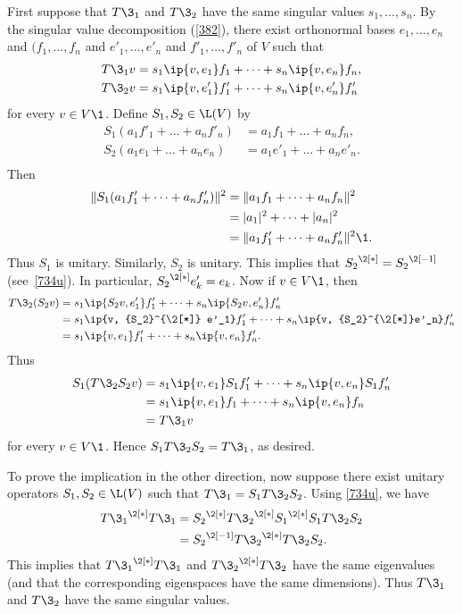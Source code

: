 \begin{Solution}
First suppose that $T\3_1$ and $T\3_2$ have the same singular values $s_1, \dots, s_n$.
By the singular value decomposition (\ref{382}), there exist orthonormal bases
$e_1, \dots, e_n$ and  $(f_1, \dots, f_n$ and $e'_1, \dots, e'_n$ and  $f'_1, \dots, f'_n$ of
$V$ such that
\begin{align*}
T\3_1v &= s_1 \ip{v, e_1} f_1 + \dots + s_n \ip{v, e_n} f_n, \\
T\3_2v &= s_1 \ip{v, e'_1} f'_1 + \dots + s_n \ip{v, e'_n} f'_n
\end{align*}
for every $v \in V\1$.  Define $S_1, S_2 \in \L(V)$ by
\begin{align*}
S_1(a_1 f'_1 + \dots + a_n f'_n) &= a_1 f_1 + \dots + a_n f_n, \\
S_2(a_1 e_1 + \dots + a_n e_n) &= a_1 e'_1 + \dots + a_n e'_n. \\
\end{align*}
Then
\begin{align*}
\|S_1(a_1 f'_1 + \dots + a_n f'_n)\|^2 &= \|a_1 f_1 + \dots + a_n f_n\|^2 \\
&= |a_1|^2 + \dots + |a_n|^2 \\
&= \|a_1 f'_1 + \dots + a_n f'_n\|^2\1.
\end{align*}
Thus $S_1$ is unitary.  Similarly, $S_2$ is unitary. This implies that
${S_2}^{\2[*]} = {S_2}^{\2[-1]}$ (see~\ref{734u}).  In particular, ${S_2}^{\2[*]} e'_k = e_k$.  Now
if $v \in V\1$, then
\begin{align*}
T\3_2(S_2 v) &= s_1 \ip{S_2v, e'_1} f'_1 + \dots + s_n \ip{S_2v, e'_n} f'_n \\
&= s_1 \ip{v, {S_2}^{\2[*]} e'_1} f'_1 + \dots + s_n \ip{v, {S_2}^{\2[*]}e'_n} f'_n \\
&= s_1 \ip{v, e_1} f'_1 + \dots + s_n \ip{v, e_n} f'_n.
\end{align*}
Thus
\begin{align*}
S_1(T\3_2 S_2 v) &= s_1 \ip{v, e_1} S_1 f'_1 + \dots + s_n \ip{v, e_n} S_1 f'_n \\
&= s_1 \ip{v, e_1} f_1 + \dots + s_n \ip{v, e_n} f_n \\
&= T\3_1 v
\end{align*}
for every $v \in V\1$.  Hence $S_1 T\3_2 S_2 = T\3_1$, as desired.

To prove the implication in the other direction, now suppose there exist
unitary operators $S_1, S_2 \in \L(V)$ such that $T\3_1 = S_1 T\3_2 S_2$.  Using \ref{734u}, we have
\begin{align*}
{T\3_1}^{\2[*]} T\3_1 &= {S_2}^{\2[*]} {T\3_2}^{\2[*]} {S_1}^{\2[*]} S_1 T\3_2 S_2 \\
&= {S_2}^{\2[-1]} {T\3_2}^{\2[*]} T\3_2 S_2.
\end{align*}
This implies that ${T\3_1}^{\2[*]} T\3_1$ and ${T\3_2}^{\2[*]} T\3_2$ have the same eigenvalues (and that
the corresponding eigenspaces have the same dimensions).  Thus $T\3_1$ and
$T\3_2$ have the same singular values.
\end{Solution}

